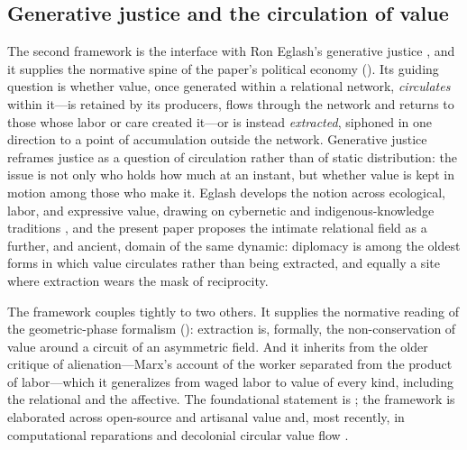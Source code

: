 \subsection{Generative justice and the circulation of value}
The second framework is the interface with Ron Eglash's generative justice \parencite{eglash2016intro}, and it supplies the normative spine of the paper's political economy (). Its guiding question is whether value, once generated within a relational network, \emph{circulates} within it---is retained by its producers, flows through the network and returns to those whose labor or care created it---or is instead \emph{extracted}, siphoned in one direction to a point of accumulation outside the network. Generative justice reframes justice as a question of circulation rather than of static distribution: the issue is not only who holds how much at an instant, but whether value is kept in motion among those who make it. Eglash develops the notion across ecological, labor, and expressive value, drawing on cybernetic and indigenous-knowledge traditions \parencite{eglash2014garvey,eglash2017engineering,eglash2024computational}, and the present paper proposes the intimate relational field as a further, and ancient, domain of the same dynamic: diplomacy is among the oldest forms in which value circulates rather than being extracted, and equally a site where extraction wears the mask of reciprocity.

The framework couples tightly to two others. It supplies the normative reading of the geometric-phase formalism (): extraction is, formally, the non-conservation of value around a circuit of an asymmetric field. And it inherits from the older critique of alienation---Marx's account of the worker separated from the product of labor---which it generalizes from waged labor to value of every kind, including the relational and the affective. The foundational statement is \textcite{eglash2016intro}; the framework is elaborated across open-source and artisanal value \parencite{eglash2014garvey,eglash2017engineering} and, most recently, in computational reparations and decolonial circular value flow \parencite{eglash2024computational}.


